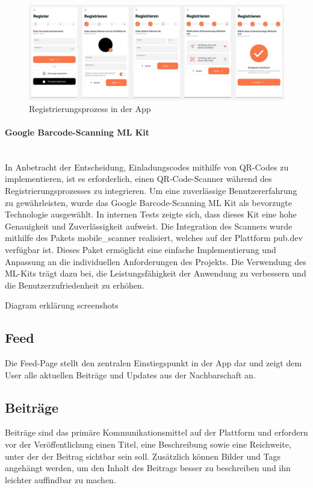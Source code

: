 \begin{figure}[h]
  \centering
  \includegraphics[width=\textwidth]{pics/registration-process.JPG}
  \caption{Registrierungsprozess in der App}
  \label{fig:registration-process}
\end{figure}

\paragraph{Google Barcode-Scanning ML Kit}\mbox{} \\
In Anbetracht der Entscheidung, Einladungscodes mithilfe von QR-Codes zu implementieren, ist es erforderlich, einen QR-Code-Scanner während des Registrierungsprozesses zu integrieren. Um eine zuverlässige Benutzererfahrung zu gewährleisten, wurde das Google Barcode-Scanning ML Kit als bevorzugte Technologie ausgewählt. In internen Tests zeigte sich, dass dieses Kit eine hohe Genauigkeit und Zuverlässigkeit aufweist.
Die Integration des Scanners wurde mithilfe des Pakets \cite{mobile_scanner} mobile\_scanner realisiert, welches auf der Plattform pub.dev verfügbar ist. Dieses Paket ermöglicht eine einfache Implementierung und Anpassung an die individuellen Anforderungen des Projekts. Die Verwendung des ML-Kits trägt dazu bei, die Leistungsfähigkeit der Anwendung zu verbessern und die Benutzerzufriedenheit zu erhöhen.


Diagram
erklärung
screenshots

\subsection{Feed}
Die Feed-Page stellt den zentralen Einstiegspunkt in der App dar und zeigt dem User alle aktuellen Beiträge und Updates aus der Nachbarschaft an.

\subsection{Beiträge}
Beiträge sind das primäre Kommunikationsmittel auf der Plattform und erfordern vor der Veröffentlichung einen Titel, eine Beschreibung sowie eine Reichweite, unter der der Beitrag sichtbar sein soll. Zusätzlich können Bilder und Tags angehängt werden, um den Inhalt des Beitrags besser zu beschreiben und ihn leichter auffindbar zu machen.

